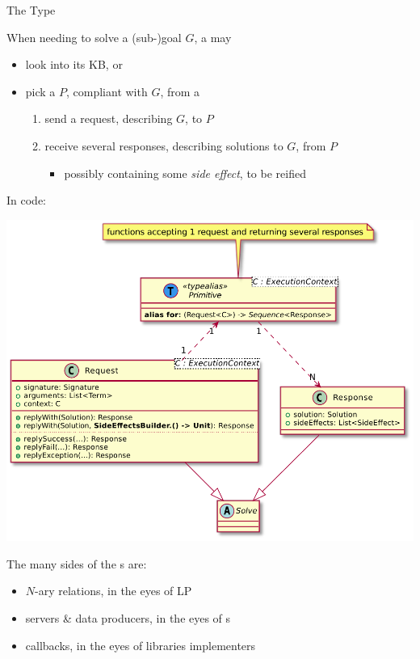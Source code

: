 \documentclass[handout]{beamer}
\begin{document}
\begin{frame}[allowframebreaks]{The  Type}
    \framebreak

    When needing to solve a (sub-)goal $G$, a  may
    \begin{itemize}
        \item look into its KB, or
        \item pick a  $P$, compliant with $G$, from a 
        \begin{enumerate}
            \item send a \alert{request}, describing $G$, to $P$
            \item receive several \alert{responses}, describing solutions to $G$, from $P$
            \begin{itemize}
                \item possibly containing some \emph{side effect}, to be \alert{reified}
            \end{itemize}
        \end{enumerate}
    \end{itemize}

    \framebreak

    In code:
    \begin{center}
        \includegraphics[width=.5\linewidth]{img/primitive.pdf}
    \end{center}

    \framebreak



    \framebreak

    \begin{block}{The many sides of the s}
         are:
        \begin{itemize}
            \item $N$-ary relations, in the eyes of LP
            \item servers \& data producers, in the eyes of s
            \item callbacks, in the eyes of libraries implementers
        \end{itemize}
    \end{block}


\end{frame}
\end{document}
